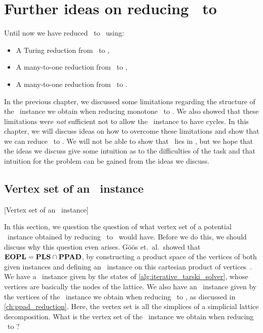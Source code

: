 \setchapterpreamble[u]{\margintoc}
\chapter{Further ideas on reducing \Tarski\ to \EOPL}\label{ch:further_ideas}

Until now we have reduced \Tarski\ to \EndOfLine\ using:
\begin{itemize}
	\item A Turing reduction from \Tarski\ to \Tarskistar,
	\item A many-to-one reduction from \Tarskistar\ to \Sperner,
	\item A many-to-one reduction from \Sperner\ to \EndOfLine.
\end{itemize}
In the previous chapter, we discussed some limitations regarding the structure of the \Sperner\ instance we obtain when reducing monotone \Tarskistar\ to \Sperner. We also showed that these limitations were \emph{not} sufficient not to allow the \EndOfLine\ instance to have cycles. In this chapter, we will discuss ideas on how to overcome these limitations and show that we can reduce \Tarski\ to \EndOfPotentialLine\@. We will not be able to show that \Tarski\ lies in \EOPL, but we hope that the ideas we discuss give some intuition as to the difficulties of the task and that intuition for the problem can be gained from the ideas we discuss.

\section{Vertex set of an \EOPL\ instance}[Vertex set of an \EOPL\ instance]

In this section, we question the question of what vertex set of a potential \EOPL\ instance obtained by reducing \Tarskistar\ to \EndOfPotentialLine\ would have. Before we do this, we should discuss why this question even arises. Göös et.\ al.\ showed that $\textbf{EOPL} = \textbf{PLS} \cap \textbf{PPAD}$, by constructing a product space of the vertices of both given instances and defining an \EndOfPotentialLine\ instance on this cartesian product of vertices~. We have a \Localopt\ instance given by the states of \cref{alg:iterative_tarski_solver}, whose vertices are basically the nodes of the lattice. We also have an \EndOfLine\ instance given by the vertices of the \Sperner\ instance we obtain when reducing \Tarskistar\ to \Sperner, as discussed in \cref{ch:ppad_reduction}. Here, the vertex set is all the simplices of a simplicial lattice decomposition. What is the vertex set of the \EndOfPotentialLine\ instance we obtain when reducing \Tarskistar\ to \EndOfLine\@?

